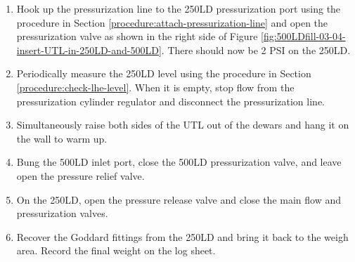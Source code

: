 \begin{enumerate}
 \item Hook up the pressurization line to the 250LD pressurization port using the procedure in Section \ref{procedure:attach-pressurization-line} and open the pressurization valve as shown in the right side of Figure \ref{fig:500LDfill-03-04-insert-UTL-in-250LD-and-500LD}.  There should now be 2 PSI on the 250LD. \label{procedure:insert-UTL-in-500LD}
 \item Periodically measure the 250LD level using the procedure in Section \ref{procedure:check-lhe-level}.  When it is empty, stop flow from the pressurization cylinder regulator and disconnect the pressurization line.
 \item Simultaneously raise both sides of the UTL out of the dewars and hang it on the wall to warm up.
 \item Bung the 500LD inlet port, close the 500LD pressurization valve, and leave open the pressure relief valve.
 \item On the 250LD, open the pressure release valve and close the main flow and pressurization valves.
 \item Recover the Goddard fittings from the 250LD and bring it back to the weigh area.  Record the final weight on the log sheet.
\end{enumerate}


